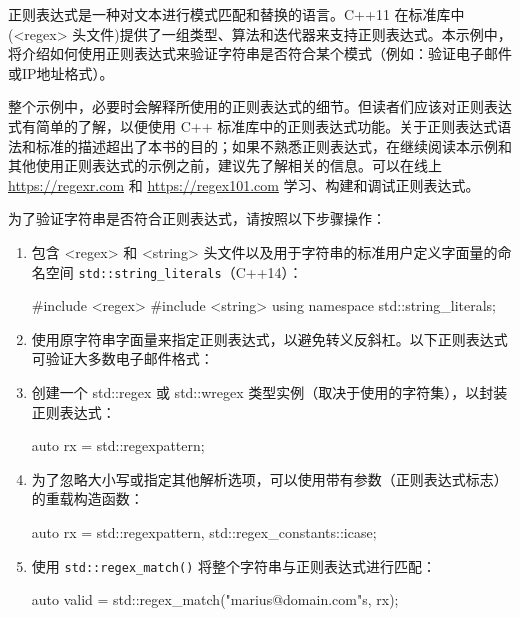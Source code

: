 

正则表达式是一种对文本进行模式匹配和替换的语言。C++11 在标准库中(<regex> 头文件)提供了一组类型、算法和迭代器来支持正则表达式。本示例中，将介绍如何使用正则表达式来验证字符串是否符合某个模式（例如：验证电子邮件或IP地址格式）。


整个示例中，必要时会解释所使用的正则表达式的细节。但读者们应该对正则表达式有简单的了解，以便使用 C++ 标准库中的正则表达式功能。关于正则表达式语法和标准的描述超出了本书的目的；如果不熟悉正则表达式，在继续阅读本示例和其他使用正则表达式的示例之前，建议先了解相关的信息。可以在线上 \url{https://regexr.com} 和 \url{https://regex101.com} 学习、构建和调试正则表达式。


为了验证字符串是否符合正则表达式，请按照以下步骤操作：

\begin{enumerate}
\item
包含 <regex> 和 <string> 头文件以及用于字符串的标准用户定义字面量的命名空间 \verb|std::string_literals|（C++14）：

\begin{cpp}
#include <regex>
#include <string>
using namespace std::string_literals;
\end{cpp}

\item
使用原字符串字面量来指定正则表达式，以避免转义反斜杠。以下正则表达式可验证大多数电子邮件格式：


\item
创建一个 std::regex 或 std::wregex 类型实例（取决于使用的字符集），以封装正则表达式：

\begin{cpp}
auto rx = std::regex{pattern};
\end{cpp}

\item
为了忽略大小写或指定其他解析选项，可以使用带有参数（正则表达式标志）的重载构造函数：

\begin{cpp}
auto rx = std::regex{pattern, std::regex_constants::icase};
\end{cpp}

\item
使用 \verb|std::regex_match()| 将整个字符串与正则表达式进行匹配：

\begin{cpp}
auto valid = std::regex_match("marius@domain.com"s, rx);
\end{cpp}
\end{enumerate}

